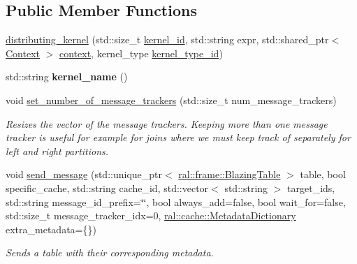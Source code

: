 \subsection*{Public Member Functions}
\begin{DoxyCompactItemize}
\item 
\hyperlink{classral_1_1cache_1_1distributing__kernel_a7dd5d1d4ee0081e8570a893209d3c4bf}{distributing\+\_\+kernel} (std\+::size\+\_\+t \hyperlink{classral_1_1cache_1_1kernel_a2fd708656cb056a41ec635b8bdc4acfe}{kernel\+\_\+id}, std\+::string expr, std\+::shared\+\_\+ptr$<$ \hyperlink{classblazingdb_1_1manager_1_1Context}{Context} $>$ \hyperlink{classral_1_1cache_1_1kernel_af0347d14d678cfa7205c1387746a2e1b}{context}, kernel\+\_\+type \hyperlink{classral_1_1cache_1_1kernel_a923841bcb8d995048c58d51a6c39caf7}{kernel\+\_\+type\+\_\+id})
\item 
\mbox{\label{classral_1_1cache_1_1distributing__kernel_aacddbb29a0760b7d19cf52d3e5a4ff84}} 
std\+::string {\bfseries kernel\+\_\+name} ()
\item 
void \hyperlink{classral_1_1cache_1_1distributing__kernel_a6466f289452c10450861276054b751da}{set\+\_\+number\+\_\+of\+\_\+message\+\_\+trackers} (std\+::size\+\_\+t num\+\_\+message\+\_\+trackers)
\begin{DoxyCompactList}\small\item\em Resizes the vector of the message trackers. Keeping more than one message tracker is useful for example for joins where we must keep track of separately for left and right partitions. \end{DoxyCompactList}\item 
void \hyperlink{classral_1_1cache_1_1distributing__kernel_aa2c88f7cefd4bb5eee4058c7059c277e}{send\+\_\+message} (std\+::unique\+\_\+ptr$<$ \hyperlink{classral_1_1frame_1_1BlazingTable}{ral\+::frame\+::\+Blazing\+Table} $>$ table, bool specific\+\_\+cache, std\+::string cache\+\_\+id, std\+::vector$<$ std\+::string $>$ target\+\_\+ids, std\+::string message\+\_\+id\+\_\+prefix=\char`\"{}\char`\"{}, bool always\+\_\+add=false, bool wait\+\_\+for=false, std\+::size\+\_\+t message\+\_\+tracker\+\_\+idx=0, \hyperlink{classral_1_1cache_1_1MetadataDictionary}{ral\+::cache\+::\+Metadata\+Dictionary} extra\+\_\+metadata=\{\})
\begin{DoxyCompactList}\small\item\em Sends a table with their corresponding metadata. \end{DoxyCompactList}\item 

\end{DoxyCompactItemize}

